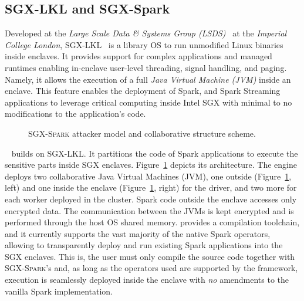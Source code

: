 \subsection{SGX-LKL and SGX-Spark}
Developed at the \textit{Large Scale Data \& Systems Group (LSDS)}~\cite{lsds} at the \textit{Imperial College London}, \textsc{SGX-LKL}~\cite{sgx-lkl} is a library OS to run unmodified Linux binaries inside enclaves.
It provides support for complex applications and managed runtimes enabling in-enclave user-level threading, signal handling, and paging.
Namely, it allows the execution of a full \textit{Java Virtual Machine (JVM)} inside an enclave. 
This feature enables the deployment of Spark, and Spark Streaming applications to leverage critical computing inside Intel SGX with minimal to no modifications to the application's code. 
\begin{figure}
    \centering
    \vspace{-21pt}
    
    \caption{\textsc{SGX-Spark} attacker model and collaborative structure scheme.\label{fig:sgx-spark-scheme}}
    \vspace{-19pt}
\end{figure}
\sgxspark~\cite{sgx-spark} builds on \textsc{SGX-LKL}.
It partitions the code of Spark applications to execute the sensitive parts inside SGX enclaves. 
Figure~\ref{fig:sgx-spark-scheme} depicts its architecture.
The engine deploys two collaborative Java Virtual Machines (JVM), one outside (Figure~\ref{fig:sgx-spark-scheme}, left) and one inside the enclave (Figure~\ref{fig:sgx-spark-scheme}, right) for the driver, and two more for each worker deployed in the cluster. 
Spark code outside the enclave accesses only encrypted data.
The communication between the JVMs is kept encrypted and is performed through the host OS shared memory.
\sgxspark provides a compilation toolchain, and it currently supports the vast majority of the native Spark operators, allowing to transparently deploy and run existing Spark applications into the SGX enclaves.
This is, the user must only compile the source code together with \textsc{SGX-Spark}'s and, as long as the operators used are supported by the framework, execution is seamlessly deployed inside the enclave with \emph{no} amendments to the vanilla Spark implementation.

